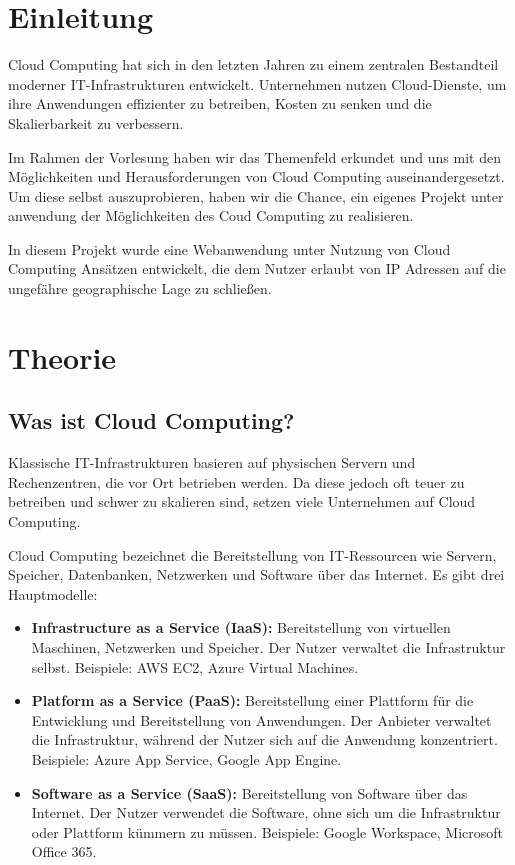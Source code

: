 \chapter{Einleitung}
Cloud Computing hat sich in den letzten Jahren zu einem zentralen Bestandteil moderner IT-Infrastrukturen entwickelt. Unternehmen nutzen Cloud-Dienste, um ihre Anwendungen effizienter zu betreiben, Kosten zu senken und die Skalierbarkeit zu verbessern. 

Im Rahmen der Vorlesung haben wir das Themenfeld erkundet und uns mit den Möglichkeiten und Herausforderungen von Cloud Computing auseinandergesetzt. Um diese selbst auszuprobieren, haben wir die Chance, ein eigenes Projekt unter anwendung der Möglichkeiten des Coud Computing zu realisieren.

In diesem Projekt wurde eine Webanwendung unter Nutzung von Cloud Computing Ansätzen entwickelt, die dem Nutzer erlaubt von IP Adressen auf die ungefähre geographische Lage zu schließen.

\chapter{Theorie}
\section{Was ist Cloud Computing?}
Klassische IT-Infrastrukturen basieren auf physischen Servern und Rechenzentren, die vor Ort betrieben werden. Da diese jedoch oft teuer zu betreiben und schwer zu skalieren sind, setzen viele Unternehmen auf Cloud Computing.

Cloud Computing bezeichnet die Bereitstellung von IT-Ressourcen wie Servern, Speicher, Datenbanken, Netzwerken und Software über das Internet. Es gibt drei Hauptmodelle:
\begin{itemize}
    \item \textbf{Infrastructure as a Service (IaaS):} Bereitstellung von virtuellen Maschinen, Netzwerken und Speicher. Der Nutzer verwaltet die Infrastruktur selbst. Beispiele: AWS EC2, Azure Virtual Machines.
    \item \textbf{Platform as a Service (PaaS):} Bereitstellung einer Plattform für die Entwicklung und Bereitstellung von Anwendungen. Der Anbieter verwaltet die Infrastruktur, während der Nutzer sich auf die Anwendung konzentriert. Beispiele: Azure App Service, Google App Engine.
    \item \textbf{Software as a Service (SaaS):} Bereitstellung von Software über das Internet. Der Nutzer verwendet die Software, ohne sich um die Infrastruktur oder Plattform kümmern zu müssen. Beispiele: Google Workspace, Microsoft Office 365.
\end{itemize}

